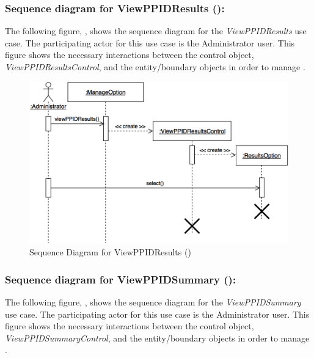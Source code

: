 \documentclass[12pt,letterpaper]{article}
\begin{document}
\subsubsection*{Sequence diagram for ViewPPIDResults ():}

The following figure, , shows the sequence diagram for the {\it ViewPPIDResults} use case. The participating actor for this use case is
the Administrator user. This figure shows the necessary interactions between the control object, {\it ViewPPIDResultsControl}, and the
entity/boundary objects in order to manage .

\begin{figure}[H]
	\centering{}
	\includegraphics[scale=0.27]{imgs/seq/view-ppid-results.png}
	\caption[ - Sequence Diagram for ViewPPIDResults]{Sequence Diagram for ViewPPIDResults ()}
\end{figure}

\newpage{}

\subsubsection*{Sequence diagram for ViewPPIDSummary ():}

The following figure, , shows the sequence diagram for the {\it ViewPPIDSummary} use case. The participating actor for this use case is
the Administrator user. This figure shows the necessary interactions between the control object, {\it ViewPPIDSummaryControl}, and the
entity/boundary objects in order to manage .
\end{document}
